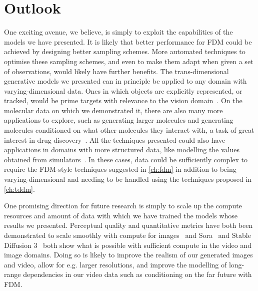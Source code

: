 \section*{Outlook}

One exciting avenue, we believe, is simply to exploit the capabilities of the models we have presented. It is likely that better performance for FDM could be achieved by designing better sampling schemes. More automated techniques to optimise these sampling schemes, and even to make them adapt when given a set of observations, would likely have further benefits. The trans-dimensional generative models we presented can in principle be applied to any domain with varying-dimensional data. Ones in which objects are explicitly represented, or tracked, would be prime targets with relevance to the vision domain~\citep{luo2021multiple,niedoba2024diffusion}. On the molecular data on which we demonstrated it, there are also many more applications to explore, such as generating larger molecules and generating molecules conditioned on what other molecules they interact with, a task of great interest in drug discovery~\citep{hoogeboom2022equivariant}. All the techniques presented could also have applications in domains with more structured data, like modelling the values obtained from simulators~\citep{weilbach2023graphically}. In these cases, data could be sufficiently complex to require the FDM-style techniques suggested in \cref{ch:fdm} in addition to being varying-dimensional and needing to be handled using the techniques proposed in \cref{ch:tddm}.

One promising direction for future research is simply to scale up the compute resources and amount of data with which we have trained the models whose results we presented. Perceptual quality and quantitative metrics have both been demonstrated to scale smoothly with compute for images~\citep{peebles2022scalable} and Sora~\citep{brooks2024video} and Stable Diffusion 3~\citep{esser2024scaling} both show what is possible with sufficient compute in the video and image domains. Doing so is likely to improve the realism of our generated images and video, allow for e.g. larger resolutions, and improve the modelling of long-range dependencies in our video data such as conditioning on the far future with FDM.

